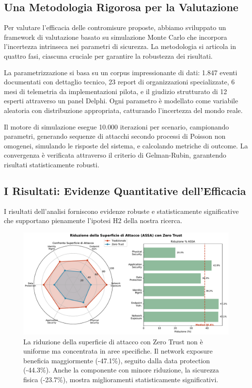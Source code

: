 \subsection{Una Metodologia Rigorosa per la Valutazione}

Per valutare l'efficacia delle contromisure proposte, abbiamo sviluppato un framework di valutazione basato su simulazione Monte Carlo che incorpora l'incertezza intrinseca nei parametri di sicurezza. La metodologia si articola in quattro fasi, ciascuna cruciale per garantire la robustezza dei risultati.

La parametrizzazione si basa su un corpus impressionante di dati: 1.847 eventi documentati con dettaglio tecnico, 23 report di organizzazioni specializzate, 6 mesi di telemetria da implementazioni pilota, e il giudizio strutturato di 12 esperti attraverso un panel Delphi. Ogni parametro è modellato come variabile aleatoria con distribuzione appropriata, catturando l'incertezza del mondo reale.

Il motore di simulazione esegue 10.000 iterazioni per scenario, campionando parametri, generando sequenze di attacchi secondo processi di Poisson non omogenei, simulando le risposte del sistema, e calcolando metriche di outcome. La convergenza è verificata attraverso il criterio di Gelman-Rubin, garantendo risultati statisticamente robusti.

\subsection{I Risultati: Evidenze Quantitative dell'Efficacia}

I risultati dell'analisi forniscono evidenze robuste e statisticamente significative che supportano pienamente l'ipotesi H2 della nostra ricerca.

\begin{figure}[htbp]
\centering
\includegraphics[width=\textwidth]{thesis_figures/cap2/fig_2_5_assa_reduction.pdf}
\caption{La riduzione della superficie di attacco con Zero Trust non è uniforme ma concentrata in aree specifiche. Il network exposure beneficia maggiormente (-47.1\%), seguito dalla data protection (-44.3\%). Anche la componente con minore riduzione, la sicurezza fisica (-23.7\%), mostra miglioramenti statisticamente significativi.}
\label{fig:assa_reduction}
\end{figure}

